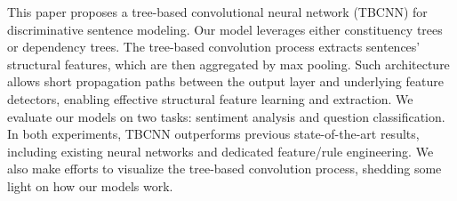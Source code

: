 This paper proposes a tree-based convolutional neural network (TBCNN) for discriminative sentence modeling. Our model leverages either constituency trees or dependency trees. The tree-based convolution process extracts sentences' structural features, which are then aggregated by max pooling. Such architecture allows short propagation paths between the output layer and underlying feature detectors, enabling effective structural feature learning and extraction. We evaluate our models on two tasks: sentiment analysis and question classification. In both experiments, TBCNN outperforms previous state-of-the-art results, including existing neural networks and dedicated feature/rule engineering. We also make efforts to visualize the tree-based convolution process, shedding some light on how our models work.
